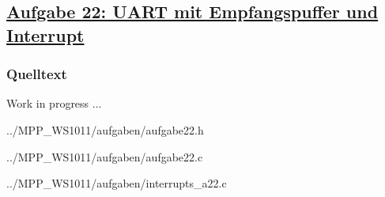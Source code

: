 \subsection*
{\href{http://cst.mi.fu-berlin.de/intern/19606-P-MPP/Aufgaben/040703.html}
{Aufgabe 22: UART mit Empfangspuffer und Interrupt}}

\subsubsection*{Quelltext}

Work in progress ...


{../MPP_WS1011/aufgaben/aufgabe22.h}


{../MPP_WS1011/aufgaben/aufgabe22.c}


{../MPP_WS1011/aufgaben/interrupts_a22.c}
